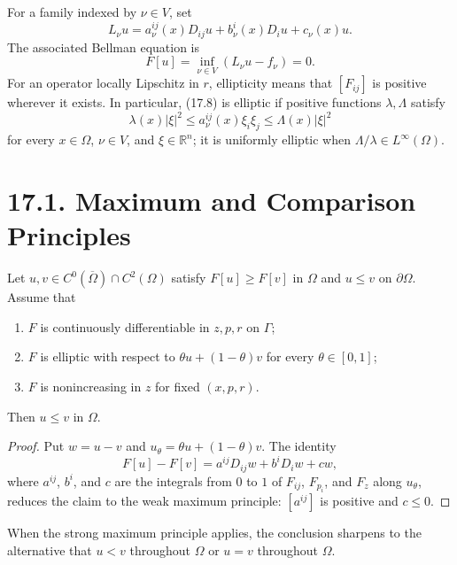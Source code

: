 For a family indexed by $\nu\in V$, set
\begin{equation}\tag{17.7}
L_\nu u=a_\nu^{ij}(x)D_{ij}u+b_\nu^i(x)D_i u+c_\nu(x)u.
\end{equation}
The associated Bellman equation is
\begin{equation}\tag{17.8}
F[u]=\inf_{\nu\in V}(L_\nu u-f_\nu)=0.
\end{equation}
For an operator locally Lipschitz in $r$, ellipticity means that $[F_{ij}]$ is
positive wherever it exists.  In particular, (17.8) is elliptic if positive
functions $\lambda,\Lambda$ satisfy
\begin{equation}\tag{17.9}
\lambda(x)|\xi|^2\le a_\nu^{ij}(x)\xi_i\xi_j
\le\Lambda(x)|\xi|^2
\end{equation}
for every $x\in\Omega$, $\nu\in V$, and $\xi\in\mathbb R^n$; it is uniformly
elliptic when $\Lambda/\lambda\in L^\infty(\Omega)$.

\section*{17.1. Maximum and Comparison Principles}

\begin{theorem}\label{gt-ch17-thm-17-1}
Let $u,v\in C^0(\overline\Omega)\cap C^2(\Omega)$ satisfy
$F[u]\ge F[v]$ in $\Omega$ and $u\le v$ on $\partial\Omega$.  Assume that
\begin{enumerate}
\item[(i)] $F$ is continuously differentiable in $z,p,r$ on $\Gamma$;
\item[(ii)] $F$ is elliptic with respect to
$\theta u+(1-\theta)v$ for every $\theta\in[0,1]$;
\item[(iii)] $F$ is nonincreasing in $z$ for fixed $(x,p,r)$.
\end{enumerate}
Then $u\le v$ in $\Omega$.
\end{theorem}
\begin{proof}
\sketch Put $w=u-v$ and $u_\theta=\theta u+(1-\theta)v$.  The identity
\[
F[u]-F[v]=a^{ij}D_{ij}w+b^iD_iw+cw,
\]
where $a^{ij}$, $b^i$, and $c$ are the integrals from $0$ to $1$ of
$F_{ij}$, $F_{p_i}$, and $F_z$ along $u_\theta$, reduces the claim to the
weak maximum principle: $[a^{ij}]$ is positive and $c\le0$.
\end{proof}

When the strong maximum principle applies, the conclusion sharpens to the
alternative that $u<v$ throughout $\Omega$ or $u=v$ throughout $\Omega$.

